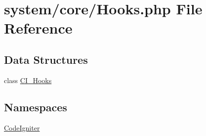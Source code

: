 \hypertarget{system_2core_2hooks_8php}{}\section{system/core/\+Hooks.php File Reference}
\label{system_2core_2hooks_8php}
\subsection*{Data Structures}
\begin{DoxyCompactItemize}
\item 
class \mbox{\hyperlink{class_c_i___hooks}{C\+I\+\_\+\+Hooks}}
\end{DoxyCompactItemize}
\subsection*{Namespaces}
\begin{DoxyCompactItemize}
\item 
 \mbox{\hyperlink{namespace_code_igniter}{Code\+Igniter}}
\end{DoxyCompactItemize}
